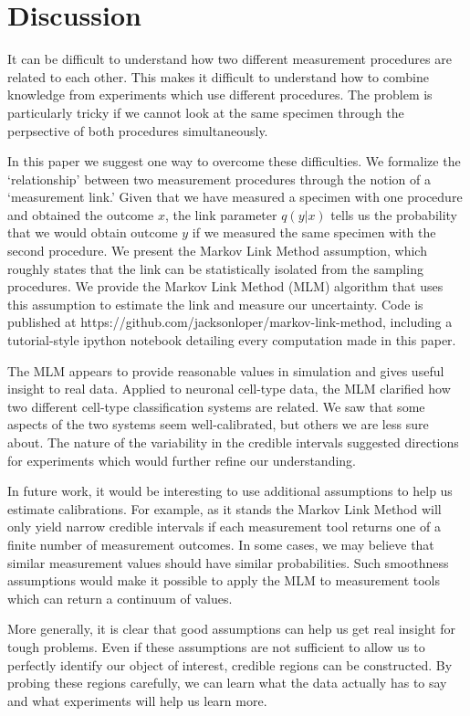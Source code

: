 \section{Discussion}

It can be difficult to understand how two different measurement procedures are related to each other.  This makes it difficult to understand how to combine knowledge from experiments which use different procedures.  The problem is particularly tricky if we cannot look at the same specimen through the perpsective of both procedures simultaneously.

In this paper we suggest one way to overcome these difficulties.  We formalize the `relationship' between two measurement procedures through the notion of a `measurement link.'  Given that we have measured a specimen with one procedure and obtained the outcome $x$, the link parameter $q(y|x)$ tells us the probability that we would obtain outcome $y$ if we measured the same specimen with the second procedure.  We present the Markov Link Method assumption, which roughly states that the link can be statistically isolated from the sampling procedures.  We provide the Markov Link Method (MLM) algorithm that uses this assumption to estimate the link and measure our uncertainty.  Code is published at https://github.com/jacksonloper/markov-link-method, including a tutorial-style ipython notebook detailing every computation made in this paper.

The MLM appears to provide reasonable values in simulation and gives useful insight to real data.  Applied to neuronal cell-type data, the MLM clarified how two different cell-type classification systems are related.  We saw that some aspects of the two systems seem well-calibrated, but others we are less sure about.  The nature of the variability in the credible intervals suggested directions for experiments which would further refine our understanding.  

In future work, it would be interesting to use additional assumptions to help us estimate calibrations.  For example, as it stands the Markov Link Method will only yield narrow credible intervals if each measurement tool returns one of a finite number of measurement outcomes.  In some cases, we may believe that similar measurement values should have similar probabilities.  Such smoothness assumptions would make it possible to apply the MLM to measurement tools which can return a continuum of values.   

More generally, it is clear that good assumptions can help us get real insight for tough problems. Even if these assumptions are not sufficient to allow us to perfectly identify our object of interest, credible regions can be constructed.  By probing these regions carefully, we can learn what the data actually has to say and what experiments will help us learn more.

